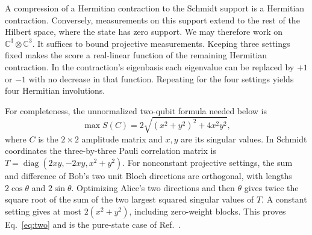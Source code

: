 \documentclass[11pt]{article}
\newcommand{\C}{\mathbb C}\newcommand{\R}{\mathbb R}\newcommand{\cB}{\mathcal B}
\begin{document}
A compression of a Hermitian contraction to the Schmidt support is a Hermitian contraction. Conversely, measurements on this support extend to the rest of the Hilbert space, where the state has zero support. We may therefore work on $\C^3\otimes\C^3$. It suffices to bound projective measurements. Keeping three settings fixed makes the score a real-linear function of the remaining Hermitian contraction. In the contraction's eigenbasis each eigenvalue can be replaced by $+1$ or $-1$ with no decrease in that function. Repeating for the four settings yields four Hermitian involutions.

For completeness, the unnormalized two-qubit formula needed below is
\begin{equation}
 \max S(C)=2\sqrt{(x^2+y^2)^2+4x^2y^2},                 \label{eq:two}
\end{equation}
where $C$ is the $2\times2$ amplitude matrix and $x,y$ are its singular values. In Schmidt coordinates the three-by-three Pauli correlation matrix is $T=\operatorname{diag}(2xy,-2xy,x^2+y^2)$. For nonconstant projective settings, the sum and difference of Bob's two unit Bloch directions are orthogonal, with lengths $2\cos\theta$ and $2\sin\theta$. Optimizing Alice's two directions and then $\theta$ gives twice the square root of the sum of the two largest squared singular values of $T$. A constant setting gives at most $2(x^2+y^2)$, including zero-weight blocks. This proves Eq.~\eqref{eq:two} and is the pure-state case of Ref.~\cite{horodecki}.
\end{document}
